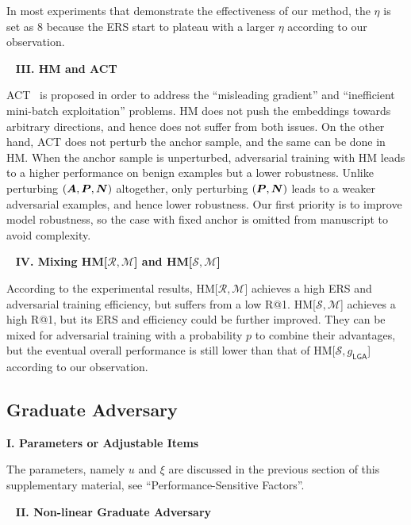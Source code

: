 In most experiments that demonstrate the effectiveness of our method, the
$\eta$ is set as $8$ because the ERS start to plateau with a larger $\eta$
according to our observation.

~\newline
\noindent\textbf{III. HM and ACT}

ACT~\cite{robrank} is proposed in order to address the ``misleading gradient''
and ``inefficient mini-batch exploitation'' problems.
%
HM does not push the embeddings towards arbitrary directions, and hence does
not suffer from both issues.
%
On the other hand, ACT does not perturb the anchor sample, and the same
can be done in HM.
%
When the anchor sample is unperturbed, adversarial training with HM leads to
a higher performance on benign examples but a lower robustness.
%
Unlike perturbing $({\bm{A}}, {\bm{P}}, {\bm{N}})$ altogether, only perturbing $({\bm{P}}, {\bm{N}})$
leads to a weaker adversarial examples, and hence lower robustness.
%
Our first priority is to improve model robustness, so the case with fixed
anchor is omitted from manuscript to avoid complexity.

~\newline
\noindent\textbf{IV. Mixing HM[$\mathcal{R},\mathcal{M}$] and
HM[$\mathcal{S},\mathcal{M}$]}

According to the experimental results, HM[$\mathcal{R},\mathcal{M}$] achieves 
a high ERS and adversarial training efficiency, but suffers from a low R@1.
%
HM[$\mathcal{S},\mathcal{M}$] achieves a high R@1, but its ERS and efficiency
could be further improved.
%
They can be mixed for adversarial training with a probability $p$ to combine
their advantages, but the eventual overall performance is still lower than
that of HM[$\mathcal{S},g_\mathsf{LGA}$] according to our observation.

\subsection{Graduate Adversary}
\label{sec:b3}

\noindent\textbf{I. Parameters or Adjustable Items}

The parameters, namely $u$ and $\xi$ are discussed in the previous section
of this supplementary material, see ``Performance-Sensitive Factors''.

~\newline
\noindent\textbf{II. Non-linear Graduate Adversary}

